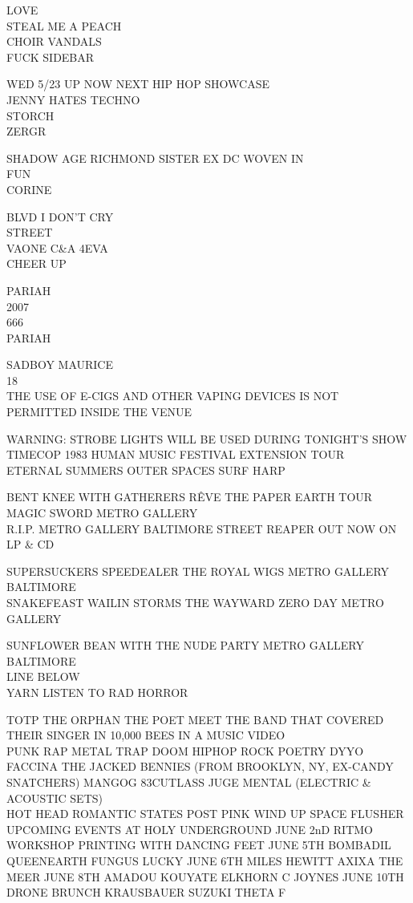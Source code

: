 \documentclass[10pt,letterpaper]{article}
\begin{document}
LOVE\\
STEAL ME A PEACH\\
CHOIR VANDALS\\
FUCK SIDEBAR

WED 5/23 UP NOW NEXT HIP HOP SHOWCASE\\
JENNY HATES TECHNO\\
STORCH\\
ZERGR

SHADOW AGE RICHMOND SISTER EX DC WOVEN IN\\
FUN\\
CORINE

BLVD I DON'T CRY\\
STREET\\
VAONE C\&A 4EVA\\
CHEER UP

PARIAH\\
2007\\
666\\
PARIAH

SADBOY MAURICE\\
18\\
THE USE OF E{-}CIGS AND OTHER VAPING DEVICES IS NOT PERMITTED INSIDE THE VENUE

WARNING: STROBE LIGHTS WILL BE USED DURING TONIGHT'S SHOW\\
TIMECOP 1983 HUMAN MUSIC FESTIVAL EXTENSION TOUR\\
ETERNAL SUMMERS OUTER SPACES SURF HARP

BENT KNEE WITH GATHERERS RÊVE THE PAPER EARTH TOUR\\
MAGIC SWORD METRO GALLERY\\
R.I.P. METRO GALLERY BALTIMORE STREET REAPER OUT NOW ON LP \& CD

SUPERSUCKERS SPEEDEALER THE ROYAL WIGS METRO GALLERY BALTIMORE\\
SNAKEFEAST WAILIN STORMS THE WAYWARD ZERO DAY METRO GALLERY

SUNFLOWER BEAN WITH THE NUDE PARTY METRO GALLERY BALTIMORE\\
LINE BELOW\\
YARN LISTEN TO RAD HORROR

TOTP THE ORPHAN THE POET MEET THE BAND THAT COVERED THEIR SINGER IN 10,000 BEES IN A MUSIC VIDEO\\
PUNK RAP METAL TRAP DOOM HIPHOP ROCK POETRY DYYO FACCINA THE JACKED BENNIES (FROM BROOKLYN, NY, EX{-}CANDY SNATCHERS) MANGOG 83CUTLASS JUGE MENTAL (ELECTRIC \& ACOUSTIC SETS)\\
HOT HEAD ROMANTIC STATES POST PINK WIND UP SPACE FLUSHER\\
UPCOMING EVENTS AT HOLY UNDERGROUND JUNE 2nD RITMO WORKSHOP PRINTING WITH DANCING FEET JUNE 5TH BOMBADIL QUEENEARTH FUNGUS LUCKY JUNE 6TH MILES HEWITT AXIXA THE MEER JUNE 8TH AMADOU KOUYATE ELKHORN C JOYNES JUNE 10TH DRONE BRUNCH KRAUSBAUER SUZUKI THETA F
\end{document}
